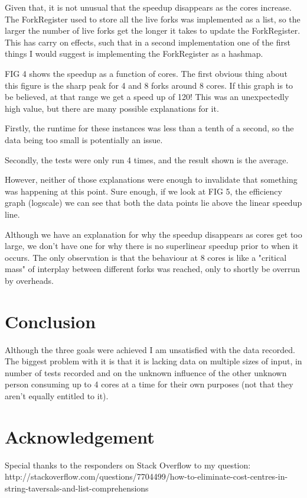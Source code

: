 \documentclass{bioinfo}
\begin{document}
Given that, it is not unusual that the speedup disappears as the cores increase. The ForkRegister used to store all the live forks was implemented as a list, so the larger the number of live forks get the longer it takes to update the ForkRegister. This has carry on effects, such that in a second implementation one of the first things I would suggest is implementing the ForkRegister as a hashmap.

FIG 4 shows the speedup as a function of cores. The first obvious thing about this figure is the sharp peak for 4 and 8 forks around 8 cores. If this graph is to be believed, at that range we get a speed up of 120! This was an unexpectedly high value, but there are many possible explanations for it.

Firstly, the runtime for these instances was less than a tenth of a second, so the data being too small is potentially an issue.

Secondly, the tests were only run 4 times, and the result shown is the average.

However, neither of those explanations were enough to invalidate that something was happening at this point. Sure enough, if we look at FIG 5, the efficiency graph (logscale) we can see that both the data points lie above the linear speedup line.

Although we have an explanation for why the speedup disappears as cores get too large, we don't have one for why there is no superlinear speedup prior to when it occurs. The only observation is that the behaviour at 8 cores is like a "critical mass" of interplay between different forks was reached, only to shortly be overrun by overheads.

\section{Conclusion}

Although the three goals were achieved I am unsatisfied with the data recorded. The biggest problem with it is that it is lacking data on multiple sizes of input, in number of tests recorded and on the unknown influence of the other unknown person consuming up to 4 cores at a time for their own purposes (not that they aren't equally entitled to it).

\section*{Acknowledgement}
Special thanks to the responders on Stack Overflow to my question:
http://stackoverflow.com/questions/7704499/how-to-eliminate-cost-centres-in-string-taversals-and-list-comprehensions
\end{document}
